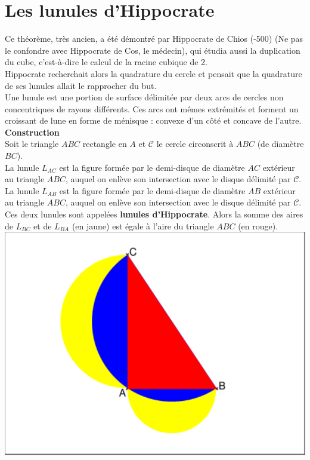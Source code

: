 \documentclass[a4paper,11pt]{book}
\begin{document}
\section{Les lunules d'Hippocrate}
Ce th\'eorème, très ancien, a \'et\'e d\'emontr\'e par Hippocrate de Chios 
(-500) (Ne pas le confondre avec Hippocrate de Cos, le m\'edecin), qui \'etudia 
aussi la duplication du cube, c’est-à-dire le calcul de la racine cubique de 2.\\
Hippocrate recherchait alors la quadrature du cercle et pensait que la 
quadrature de ses lunules allait le rapprocher du but.\\
Une lunule est une portion de surface d\'elimit\'ee par deux arcs de cercles 
non concentriques de rayons diff\'erents. Ces arcs ont m\^emes extr\'emit\'es et
forment un croissant de lune en forme de m\'enisque : convexe d’un côt\'e et 
concave de l’autre.\\
{\bf Construction}\\
Soit le triangle $ABC$ rectangle en $A$ et $\mathcal{C}$ le cercle circonscrit 
à $ABC$ (de diamètre $BC$).\\
La lunule $L_{AC}$ est la figure form\'ee par le demi-disque de diamètre $AC$ 
ext\'erieur au triangle $ABC$, auquel on enlève son intersection avec le disque 
d\'elimit\'e par $\mathcal{C}$.\\
La lunule $L_{AB}$ est la figure form\'ee par le demi-disque de diamètre $AB$ 
ext\'erieur au triangle $ABC$, auquel on enlève son intersection avec le disque 
d\'elimit\'e par $\mathcal{C}$.
Ces deux lunules sont appel\'ees {\bf lunules d'Hippocrate}.
Alors la somme des aires de $L_{BC}$ et de $L_{BA}$ (en jaune) est \'egale à 
l'aire du triangle $ABC$ (en rouge).
\includegraphics[width=\textwidth]{lunules}
\end{document}
